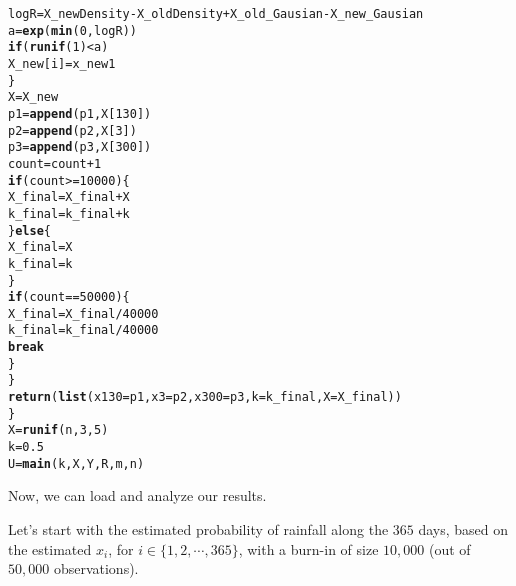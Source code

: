 \documentclass[12pt]{article}\usepackage[]{graphicx}\usepackage[]{color}
\makeatletter
\newcommand{\hlnum}[1]{\textcolor[rgb]{0.686,0.059,0.569}{#1}}%
\newcommand{\hlopt}[1]{\textcolor[rgb]{0,0,0}{#1}}%
\newcommand{\hlstd}[1]{\textcolor[rgb]{0.345,0.345,0.345}{#1}}%
\newcommand{\hlkwa}[1]{\textcolor[rgb]{0.161,0.373,0.58}{\textbf{#1}}}%
\newcommand{\hlkwb}[1]{\textcolor[rgb]{0.69,0.353,0.396}{#1}}%
\newcommand{\hlkwc}[1]{\textcolor[rgb]{0.333,0.667,0.333}{#1}}%
\newcommand{\hlkwd}[1]{\textcolor[rgb]{0.737,0.353,0.396}{\textbf{#1}}}%
\newenvironment{kframe}{%
 \def\at@end@of@kframe{}%
 \ifinner\ifhmode%
  \def\at@end@of@kframe{\end{minipage}}%
  \begin{minipage}{\columnwidth}%
 \fi\fi%
 \def\FrameCommand##1{\hskip\@totalleftmargin \hskip-\fboxsep
 \colorbox{shadecolor}{##1}\hskip-\fboxsep
     \hskip-\linewidth \hskip-\@totalleftmargin \hskip\columnwidth}%
 \MakeFramed {\advance\hsize-\width
   \@totalleftmargin\z@ \linewidth\hsize
   \@setminipage}}%
 {\par\unskip\endMakeFramed%
 \at@end@of@kframe}
\newenvironment{knitrout}{}{} %
\makeatother
\begin{document}
\begin{knitrout}
\begin{kframe}
\begin{alltt}
            \hlstd{logR} \hlkwb{=} \hlstd{X_newDensity} \hlopt{-} \hlstd{X_oldDensity} \hlopt{+} \hlstd{X_old_Gausian} \hlopt{-} \hlstd{X_new_Gausian}
            \hlstd{a} \hlkwb{=} \hlkwd{exp}\hlstd{(}\hlkwd{min}\hlstd{(}\hlnum{0}\hlstd{, logR))}
            \hlkwa{if} \hlstd{(}\hlkwd{runif}\hlstd{(}\hlnum{1}\hlstd{)} \hlopt{<} \hlstd{a)}
                \hlstd{X_new[i]} \hlkwb{=} \hlstd{x_new1}
        \hlstd{\}}
        \hlstd{X} \hlkwb{=} \hlstd{X_new}
        \hlstd{p1} \hlkwb{=} \hlkwd{append}\hlstd{(p1, X[}\hlnum{130}\hlstd{])}
        \hlstd{p2} \hlkwb{=} \hlkwd{append}\hlstd{(p2, X[}\hlnum{3}\hlstd{])}
        \hlstd{p3} \hlkwb{=} \hlkwd{append}\hlstd{(p3, X[}\hlnum{300}\hlstd{])}
        \hlstd{count} \hlkwb{=} \hlstd{count} \hlopt{+} \hlnum{1}
        \hlkwa{if} \hlstd{(count} \hlopt{>=} \hlnum{10000}\hlstd{) \{}
            \hlstd{X_final} \hlkwb{=} \hlstd{X_final} \hlopt{+} \hlstd{X}
            \hlstd{k_final} \hlkwb{=} \hlstd{k_final} \hlopt{+} \hlstd{k}
        \hlstd{\}} \hlkwa{else} \hlstd{\{}
            \hlstd{X_final} \hlkwb{=} \hlstd{X}
            \hlstd{k_final} \hlkwb{=} \hlstd{k}
        \hlstd{\}}
        \hlkwa{if} \hlstd{(count} \hlopt{==} \hlnum{50000}\hlstd{) \{}
            \hlstd{X_final} \hlkwb{=} \hlstd{X_final}\hlopt{/}\hlnum{40000}
            \hlstd{k_final} \hlkwb{=} \hlstd{k_final}\hlopt{/}\hlnum{40000}
            \hlkwa{break}
        \hlstd{\}}
    \hlstd{\}}
    \hlkwd{return}\hlstd{(}\hlkwd{list}\hlstd{(}\hlkwc{x130} \hlstd{= p1,} \hlkwc{x3} \hlstd{= p2,} \hlkwc{x300} \hlstd{= p3,} \hlkwc{k} \hlstd{= k_final,} \hlkwc{X} \hlstd{= X_final))}
\hlstd{\}}
\hlstd{X} \hlkwb{=} \hlkwd{runif}\hlstd{(n,} \hlnum{3}\hlstd{,} \hlnum{5}\hlstd{)}
\hlstd{k} \hlkwb{=} \hlnum{0.5}
\hlstd{U} \hlkwb{=} \hlkwd{main}\hlstd{(k, X, Y, R, m, n)}
\end{alltt}
\end{kframe}
\end{knitrout}

Now, we can load and analyze our results.

Let's start with the estimated probability of rainfall along the $365$ days, based on the estimated $x_i$, for $i \in \{1, 2, \cdots, 365\}$, with a burn-in of size $10,000$ (out of $50,000$ observations).
\end{document}
